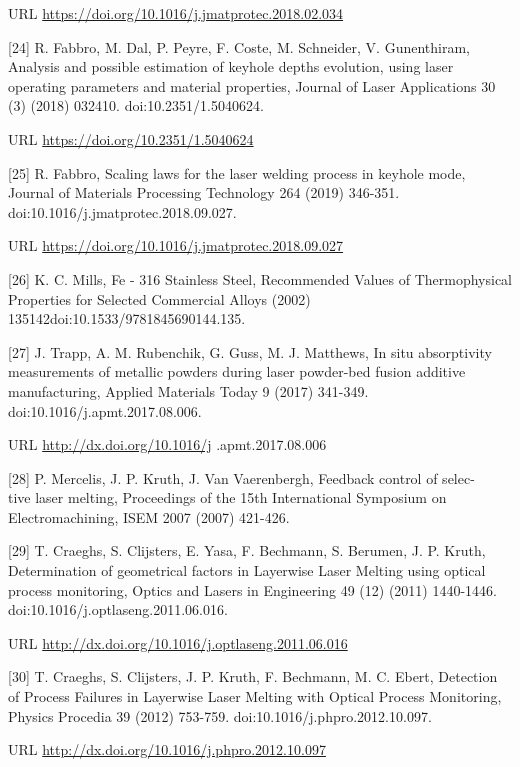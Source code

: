 \documentclass[10pt]{article}
\begin{document}
URL \href{https://doi.org/10.1016/j.jmatprotec.2018.02.034}{https://doi.org/10.1016/j.jmatprotec.2018.02.034}

[24] R. Fabbro, M. Dal, P. Peyre, F. Coste, M. Schneider, V. Gunenthiram, Analysis and possible estimation of keyhole depths evolution, using laser operating parameters and material properties, Journal of Laser Applications 30 (3) (2018) 032410. doi:10.2351/1.5040624.

URL \href{https://doi.org/10.2351/1.5040624}{https://doi.org/10.2351/1.5040624}

[25] R. Fabbro, Scaling laws for the laser welding process in keyhole mode, Journal of Materials Processing Technology 264 (2019) 346-351. doi:10.1016/j.jmatprotec.2018.09.027.

URL \href{https://doi.org/10.1016/j.jmatprotec.2018.09.027}{https://doi.org/10.1016/j.jmatprotec.2018.09.027}

[26] K. C. Mills, Fe - 316 Stainless Steel, Recommended Values of Thermophysical Properties for Selected Commercial Alloys (2002) 135142doi:10.1533/9781845690144.135.

[27] J. Trapp, A. M. Rubenchik, G. Guss, M. J. Matthews, In situ absorptivity measurements of metallic powders during laser powder-bed fusion additive manufacturing, Applied Materials Today 9 (2017) 341-349. doi:10.1016/j.apmt.2017.08.006.

URL \href{http://dx.doi.org/10.1016/j}{http://dx.doi.org/10.1016/j} .apmt.2017.08.006

[28] P. Mercelis, J. P. Kruth, J. Van Vaerenbergh, Feedback control of selec-\\
tive laser melting, Proceedings of the 15th International Symposium on Electromachining, ISEM 2007 (2007) 421-426.

[29] T. Craeghs, S. Clijsters, E. Yasa, F. Bechmann, S. Berumen, J. P. Kruth, Determination of geometrical factors in Layerwise Laser Melting using optical process monitoring, Optics and Lasers in Engineering 49 (12) (2011) 1440-1446. doi:10.1016/j.optlaseng.2011.06.016.

URL \href{http://dx.doi.org/10.1016/j.optlaseng.2011.06.016}{http://dx.doi.org/10.1016/j.optlaseng.2011.06.016}

[30] T. Craeghs, S. Clijsters, J. P. Kruth, F. Bechmann, M. C. Ebert, Detection of Process Failures in Layerwise Laser Melting with Optical Process Monitoring, Physics Procedia 39 (2012) 753-759. doi:10.1016/j.phpro.2012.10.097.

URL \href{http://dx.doi.org/10.1016/j.phpro.2012.10.097}{http://dx.doi.org/10.1016/j.phpro.2012.10.097}
\end{document}
